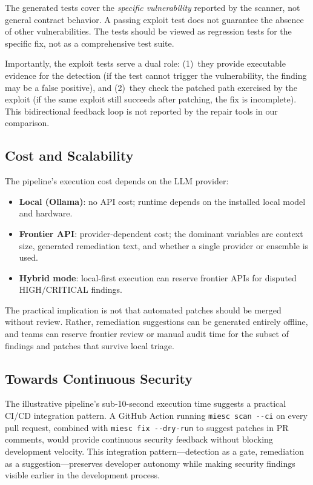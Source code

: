 \documentclass[conference]{IEEEtran}
\begin{document}
The generated tests cover the \emph{specific vulnerability} reported by the scanner, not general contract behavior. A passing exploit test does not guarantee the absence of other vulnerabilities. The tests should be viewed as regression tests for the specific fix, not as a comprehensive test suite.

Importantly, the exploit tests serve a dual role: (1)~they provide executable evidence for the detection (if the test cannot trigger the vulnerability, the finding may be a false positive), and (2)~they check the patched path exercised by the exploit (if the same exploit still succeeds after patching, the fix is incomplete). This bidirectional feedback loop is not reported by the repair tools in our comparison.

\subsection{Cost and Scalability}

The pipeline's execution cost depends on the LLM provider:
\begin{itemize}
    \item \textbf{Local (Ollama)}: no API cost; runtime depends on the installed local model and hardware.
    \item \textbf{Frontier API}: provider-dependent cost; the dominant variables are context size, generated remediation text, and whether a single provider or ensemble is used.
    \item \textbf{Hybrid mode}: local-first execution can reserve frontier APIs for disputed HIGH/CRITICAL findings.
\end{itemize}

The practical implication is not that automated patches should be merged without review. Rather, remediation suggestions can be generated entirely offline, and teams can reserve frontier review or manual audit time for the subset of findings and patches that survive local triage.

\subsection{Towards Continuous Security}

The illustrative pipeline's sub-10-second execution time suggests a practical CI/CD integration pattern. A GitHub Action running \texttt{miesc scan -{}-ci} on every pull request, combined with \texttt{miesc fix -{}-dry-run} to suggest patches in PR comments, would provide continuous security feedback without blocking development velocity. This integration pattern---detection as a gate, remediation as a suggestion---preserves developer autonomy while making security findings visible earlier in the development process.
\end{document}
